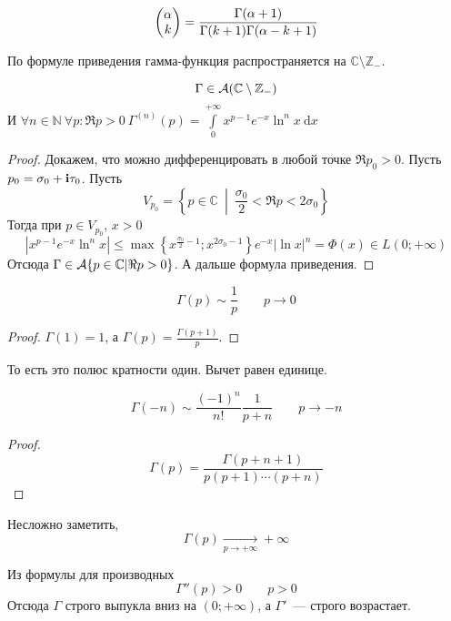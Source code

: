 \documentclass{article}
\begin{document}
    \begin{corollary}
        $$
        \left(\begin{matrix}\alpha\\k\end{matrix}\right)=\frac{\Gamma(\alpha+1)}{\Gamma(k+1)\Gamma(\alpha-k+1)}
        $$
    \end{corollary}
    \begin{remark}
        По формуле приведения гамма-функция распространяется на $\mathbb C\setminus\mathbb Z_-$.
    \end{remark}
    \begin{property}
        $$\Gamma\in{\mathcal{A}}(\mathbb C\setminus\mathbb Z_-)$$
        И $\forall n\in\mathbb N~\forall p:\Re p>0~\Gamma^{(n)}(p)=\int\limits_0^{+\infty}x^{p-1}e^{-x}\ln^n x~\mathrm dx$
    \end{property}
    \begin{proof}
        Докажем, что можно дифференцировать в любой точке $\Re p_0>0$. Пусть $p_0=\sigma_0+{\mathbf i}\tau_0$. Пусть
        $$
        V_{p_0}=\left\{p\in\mathbb C~\middle|~\frac{\sigma_0}2<\Re p<2\sigma_0\right\}
        $$
        Тогда при $p\in V_{p_0}$, $x>0$
        $$
        \left|x^{p-1}e^{-x}\ln^nx\right|\leqslant\max\left\{x^{\frac{\sigma_0}2-1};x^{2\sigma_0-1}\right\}e^{-x}|\ln x|^n=\Phi(x)\in L(0;+\infty)
        $$
        Отсюда $\Gamma\in{\mathcal{A}}\{p\in\mathbb C|\Re p>0\}$. А дальше формула приведения.
    \end{proof}
    \begin{property}
        $$
        \Gamma(p)\sim\frac1p\qquad p\to0
        $$
    \end{property}
    \begin{proof}
        $\Gamma(1)=1$, а $\Gamma(p)=\frac{\Gamma(p+1)}p$.
    \end{proof}
    \begin{remark}
        То есть это полюс кратности один. Вычет равен единице.
    \end{remark}
    \begin{property}
        $$\Gamma(-n)\sim\frac{(-1)^n}{n!}\frac1{p+n}\qquad p\to -n$$
    \end{property}
    \begin{proof}
        $$
        \Gamma(p)=\frac{\Gamma(p+n+1)}{p(p+1)\cdots(p+n)}
        $$
    \end{proof}
    \begin{property}
        Несложно заметить,
        $$\Gamma(p)\underset{p\to+\infty}\longrightarrow+\infty$$
    \end{property}
    \begin{property}
        Из формулы для производных
        $$
        \Gamma''(p)>0\qquad p>0
        $$
        Отсюда $\Gamma$ строго выпукла вниз на $(0;+\infty)$, а $\Gamma'$~--- строго возрастает.
    \end{property}
\end{document}
